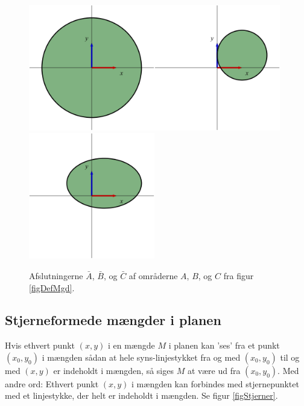 \begin{figure}[h]
\centerline{\includegraphics[height=55mm]{plotAfs1.pdf}\quad \includegraphics[height=55mm]{plotAfs2.pdf}\quad \includegraphics[height=55mm]{plotAfs3.pdf}}
\begin{center}
\caption{Afslutningerne  $\bar{A}$, $\bar{B}$, og $\bar{C}$ af områderne $A$, $B$, og $C$ fra figur \ref{figDefMgd}.} \label{figDefMgdAfs}
\end{center}
\end{figure}



\subsection{Stjerneformede mængder i planen}

\begin{definition}
Hvis ethvert punkt $(x, y)$ i en mængde $M$ i planen kan 'ses' fra et punkt $(x_{0}, y_{0})$ i mængden sådan at hele syns-linjestykket fra og med $(x_{0}, y_{0})$ til og med $(x,y)$ er indeholdt i mængden, så siges $M$ at være  ud fra  $(x_{0}, y_{0})$.  Med andre ord: Ethvert punkt $(x,y)$ i mængden kan forbindes med stjernepunktet med et linjestykke, der helt er indeholdt i mængden. Se figur \ref{figStjerner}.
\end{definition}

